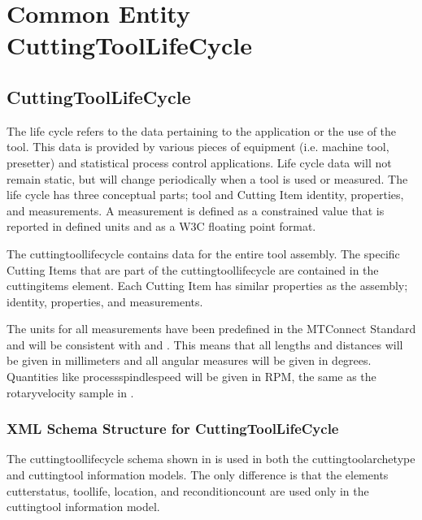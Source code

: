 \documentclass{mtconnect}	%
\begin{document}
\section{Common Entity CuttingToolLifeCycle}
\label{sec:Common Entity CuttingToolLifeCycle}

\subsection{CuttingToolLifeCycle}
\label{sec:CuttingToolLifeCycle}

The life cycle refers to the data pertaining to the application or the use of the tool.  This data is provided by various pieces of equipment (i.e. machine tool, presetter) and statistical process control applications.  Life cycle data will not remain static, but will change periodically when a tool is used or measured.  The life cycle has three conceptual parts; tool and Cutting Item identity, properties, and measurements.  A measurement is defined as a constrained value that is reported in defined units and as a W3C floating point format.

The \gls{cuttingtoollifecycle} contains data for the entire tool assembly.  The specific Cutting Items that are part of the \gls{cuttingtoollifecycle} are contained in the \glspl{cuttingitem} element.  Each Cutting Item has similar properties as the assembly; identity, properties, and measurements.

The units for all measurements have been predefined in the MTConnect Standard and will be consistent with  and .  This means that all lengths and distances will be given in millimeters and all angular measures will be given in degrees.  Quantities like \gls{processspindlespeed} will be given in RPM, the same as the \gls{rotaryvelocity sample} in .

\subsubsection{XML Schema Structure for CuttingToolLifeCycle}

The \gls{cuttingtoollifecycle} schema shown in  is used in both the \gls{cuttingtoolarchetype} and \gls{cuttingtool} \glspl{information model}.  The only difference is that the elements \gls{cutterstatus}, \gls{toollife}, \gls{location}, and \gls{reconditioncount} are used only in the \gls{cuttingtool} \gls{information model}.
\end{document}
